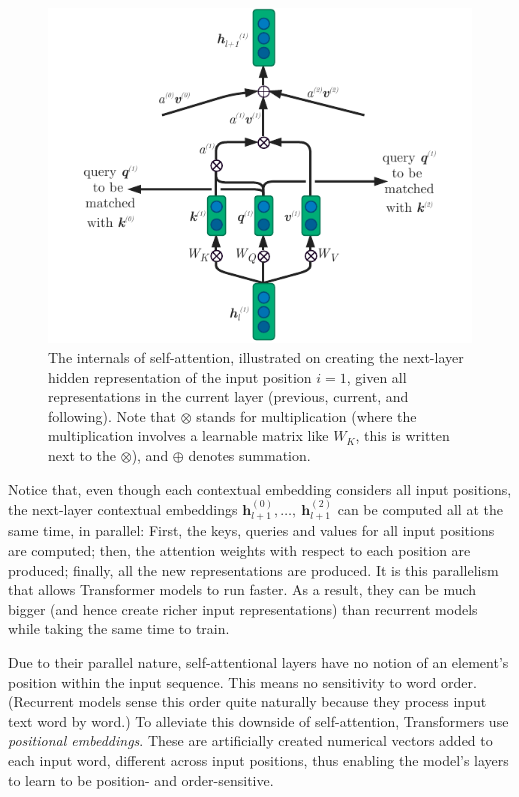 \documentclass[bsc,frontabs,twoside,singlespacing,parskip,deptreport]{infthesis}
\begin{document}
{{{      \begin{figure}[h!t]
        \centering
        \includegraphics[width=12cm]{graphics/self-att}
        \cprotect\caption{The internals of self-attention, illustrated on creating the next-layer hidden representation of the input position $i=1$, given all representations in the current layer (previous, current, and following). Note that $\otimes$ stands for multiplication (where the multiplication involves a learnable matrix like $W_K$, this is written next to the $\otimes$), and $\oplus$ denotes summation.}
        \label{fig:self-att}
      \end{figure}

      Notice that, even though each contextual embedding considers all input positions, the next-layer contextual embeddings $\bm{h}_{l+1}^{(0)},\ldots,\ \bm{h}_{l+1}^{(2)}$ can be computed all at the same time, in parallel: First, the keys, queries and values for all input positions are computed; then, the attention weights with respect to each position are produced; finally, all the new representations are produced. It is this parallelism that allows Transformer models to run faster. As a result, they can be much bigger (and hence create richer input representations) than recurrent models while taking the same time to train.

      Due to their parallel nature, self-attentional layers have no notion of an element's position within the input sequence. This means no sensitivity to word order. (Recurrent models sense this order quite naturally because they process input text word by word.) To alleviate this downside of self-attention, Transformers use \textit{positional embeddings}. These are artificially created numerical vectors added to each input word, different across input positions, thus enabling the model's layers to learn to be position- and order-sensitive.

}}}
\end{document}

